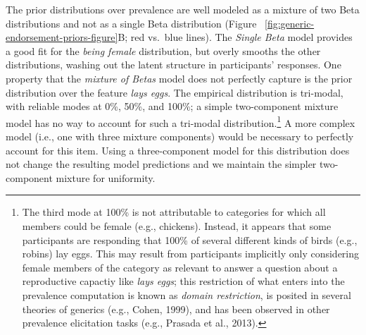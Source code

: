 \documentclass[english,,man,floatsintext]{apa6}
\let\rmarkdownfootnote\footnote%
\def\footnote{\protect\rmarkdownfootnote}
\theoremstyle{definition}
\theoremstyle{definition}
\theoremstyle{definition}
\theoremstyle{remark}
\begin{document}
The prior distributions over prevalence are well modeled as a mixture of
two Beta distributions and not as a single Beta distribution (Figure~
\ref{fig:generic-endorsement-priors-figure}B; red vs.~blue lines). The
\emph{Single Beta} model provides a good fit for the \emph{being female}
distribution, but overly smooths the other distributions, washing out
the latent structure in participants' responses. One property that the
\emph{mixture of Betas} model does not perfectly capture is the prior
distribution over the feature \emph{lays eggs}. The empirical
distribution is tri-modal, with reliable modes at 0\%, 50\%, and 100\%;
a simple two-component mixture model has no way to account for such a
tri-modal distribution.\footnote{The third mode at 100\% is not
  attributable to categories for which all members could be female
  (e.g., chickens). Instead, it appears that some participants are
  responding that 100\% of several different kinds of birds (e.g.,
  robins) lay eggs. This may result from participants implicitly only
  considering female members of the category as relevant to answer a
  question about a reproductive capactiy like \emph{lays eggs}; this
  restriction of what enters into the prevalence computation is known as
  \emph{domain restriction}, is posited in several theories of generics
  (e.g., Cohen, 1999), and has been observed in other prevalence
  elicitation tasks (e.g., Prasada et al., 2013).} A more complex model
(i.e., one with three mixture components) would be necessary to
perfectly account for this item. Using a three-component model for this
distribution does not change the resulting model predictions and we
maintain the simpler two-component mixture for uniformity.
\end{document}
